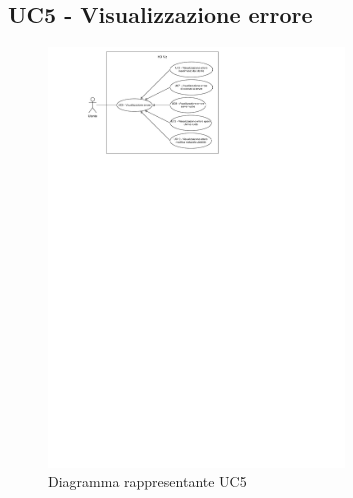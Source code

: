 \subsection{UC5 - Visualizzazione errore}
\label{sub:uc5}

\begin{figure}[h]
    \centering
    \includegraphics[width=0.7\textwidth]{componenti/casi-duso/diagrammi/UC5.pdf}
    \caption{Diagramma rappresentante UC5}
    \label{fig:UC5}
\end{figure}

